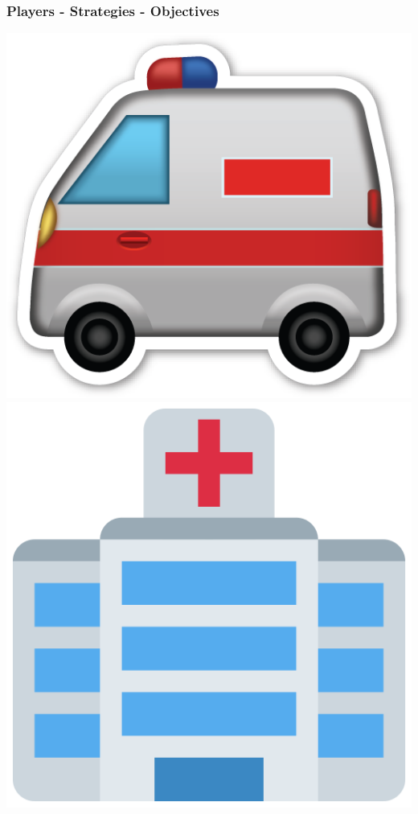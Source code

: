 \begin{frame}
    \frametitle{Players - Strategies - Objectives}
    \centering

    \includegraphics[scale=0.1]{Bin/cartoon_pics/ambulance_cartoon.png}
    \hspace{2cm}
    \includegraphics[scale=0.1]{Bin/cartoon_pics/hospital.png}

\end{frame}
